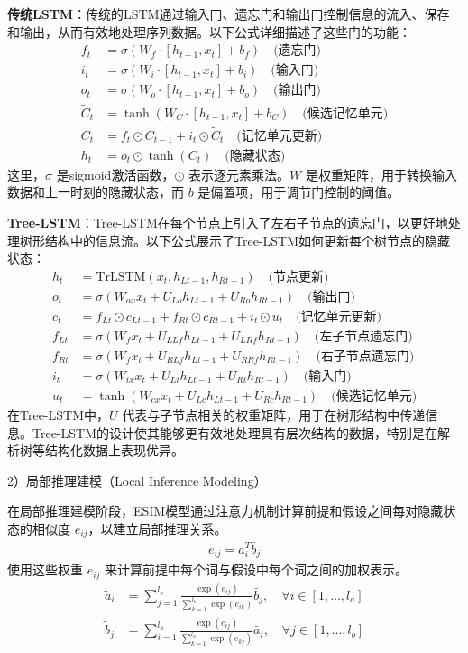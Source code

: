 \textbf{传统LSTM}：传统的LSTM通过输入门、遗忘门和输出门控制信息的流入、保存和输出，从而有效地处理序列数据。以下公式详细描述了这些门的功能：
\begin{align}
    f_t &= \sigma(W_f \cdot [h_{t-1}, x_t] + b_f) \quad \text{(遗忘门)} \\
    i_t &= \sigma(W_i \cdot [h_{t-1}, x_t] + b_i) \quad \text{(输入门)} \\
    o_t &= \sigma(W_o \cdot [h_{t-1}, x_t] + b_o) \quad \text{(输出门)} \\
    \tilde{C}_t &= \tanh(W_C \cdot [h_{t-1}, x_t] + b_C) \quad \text{(候选记忆单元)} \\
    C_t &= f_t \odot C_{t-1} + i_t \odot \tilde{C}_t \quad \text{(记忆单元更新)} \\
    h_t &= o_t \odot \tanh(C_t) \quad \text{(隐藏状态)}
\end{align}
这里，\( \sigma \) 是sigmoid激活函数，\( \odot \) 表示逐元素乘法。\( W \) 是权重矩阵，用于转换输入数据和上一时刻的隐藏状态，而 \( b \) 是偏置项，用于调节门控制的阈值。

\textbf{Tree-LSTM}：Tree-LSTM在每个节点上引入了左右子节点的遗忘门，以更好地处理树形结构中的信息流。以下公式展示了Tree-LSTM如何更新每个树节点的隐藏状态：
\begin{align}
    h_t &= \text{TrLSTM}(x_t, h_{Lt-1}, h_{Rt-1}) \quad \text{(节点更新)} \\
    o_t &= \sigma(W_{ox} x_t + U_{Lo} h_{Lt-1} + U_{Ro} h_{Rt-1}) \quad \text{(输出门)} \\
    c_t &= f_{Lt} \odot c_{Lt-1} + f_{Rt} \odot c_{Rt-1} + i_t \odot u_t \quad \text{(记忆单元更新)} \\
    f_{Lt} &= \sigma(W_{f} x_t + U_{LLf} h_{Lt-1} + U_{LRf} h_{Rt-1}) \quad \text{(左子节点遗忘门)} \\
    f_{Rt} &= \sigma(W_{f} x_t + U_{RLf} h_{Lt-1} + U_{RRf} h_{Rt-1}) \quad \text{(右子节点遗忘门)} \\
    i_t &= \sigma(W_{ix} x_t + U_{Li} h_{Lt-1} + U_{Ri} h_{Rt-1}) \quad \text{(输入门)} \\
    u_t &= \tanh(W_{cx} x_t + U_{Lc} h_{Lt-1} + U_{Rc} h_{Rt-1}) \quad \text{(候选记忆单元)}
\end{align}
在Tree-LSTM中，\( U \) 代表与子节点相关的权重矩阵，用于在树形结构中传递信息。Tree-LSTM的设计使其能够更有效地处理具有层次结构的数据，特别是在解析树等结构化数据上表现优异。


2）局部推理建模（Local Inference Modeling）

在局部推理建模阶段，ESIM模型通过注意力机制计算前提和假设之间每对隐藏状态的相似度 \( e_{ij} \)，以建立局部推理关系。
\begin{align}
    e_{ij} = \bar{a}_i^T \bar{b}_j
\end{align}
使用这些权重 \( e_{ij} \) 来计算前提中每个词与假设中每个词之间的加权表示。
\begin{align}
    \tilde{a}_i &= \sum_{j=1}^{l_b} \frac{\exp(e_{ij})}{\sum_{k=1}^{l_b} \exp(e_{ik})} \bar{b}_j, \quad \forall i \in [1, \ldots, l_a] \\
    \tilde{b}_j &= \sum_{i=1}^{l_a} \frac{\exp(e_{ij})}{\sum_{k=1}^{l_a} \exp(e_{kj})} \bar{a}_i, \quad \forall j \in [1, \ldots, l_b]
\end{align}

